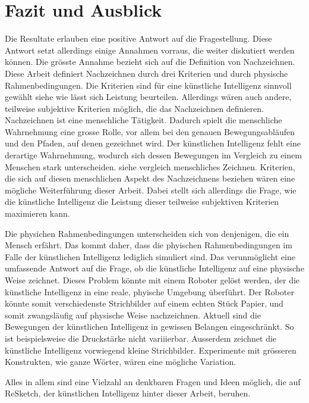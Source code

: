 \section{Fazit und Ausblick}
Die Resultate erlauben eine positive Antwort auf die Fragestellung. Diese
Antwort setzt allerdings einige Annahmen vorraus, die weiter diskutiert werden
können. Die grösste Annahme bezieht sich auf die Definition von Nachzeichnen.
Diese Arbeit definiert Nachzeichnen durch drei Kriterien und durch physische
Rahmenbedingungen. Die Kriterien sind für eine künstliche Intelligenz sinnvoll
gewählt {siehe wie lässt sich Leistung beurteilen}. Allerdings wären auch
andere, teilweise subjektive Kriterien möglich, die das Nachzeichnen definieren.
Nachzeichnen ist eine menschliche Tätigkeit. Dadurch spielt die menschliche
Wahrnehmung eine grosse Rolle, vor allem bei den genauen Bewegungsabläufen und
den Pfaden, auf denen gezeichnet wird. Der künstlichen Intelligenz fehlt eine
derartige Wahrnehmung, wodurch sich dessen Bewegungen im Vergleich zu einem
Menschen stark unterscheiden. {siehe vergleich menschliches Zeichnen}.
Kriterien, die sich auf diesen menschlichen Aspekt des Nachzeichnens beziehen
wären eine mögliche Weiterführung dieser Arbeit. Dabei stellt sich allerdings
die Frage, wie die künstliche Intelligenz die Leistung dieser teilweise
subjektiven Kriterien maximieren kann.

Die physichen Rahmenbedingungen unterscheiden sich von denjenigen, die ein
Mensch erfährt. Das kommt daher, dass die phyischen Rahmenbedingungen im Falle
der künstlichen Intelligenz lediglich simuliert sind. Das verunmöglicht eine
umfassende Antwort auf die Frage, ob die künstliche Intelligenz auf eine
physische Weise zeichnet. Dieses Problem könnte mit einem Roboter gelöst werden,
der die künstliche Intelligenz in eine reale, phyische Umgebung überführt. Der
Roboter könnte somit verschiedenste Strichbilder auf einem echten Stück Papier,
und somit zwangsläufig auf physische Weise nachzeichnen. 
Aktuell sind die Bewegungen der künstlichen Intelligenz in gewissen Belangen
eingeschränkt. So ist beispielsweise die Druckstärke nicht variiierbar. Ausserdem
zeichnet die künstliche Intelligenz vorwiegend kleine Strichbilder. Experimente
mit grösseren Konstrukten, wie ganze Wörter, wären eine mögliche Variation.

Alles in allem sind eine Vielzahl an denkbaren Fragen und Ideen möglich, die auf
ReSketch, der künstlichen Intelligenz hinter dieser Arbeit, beruhen.






